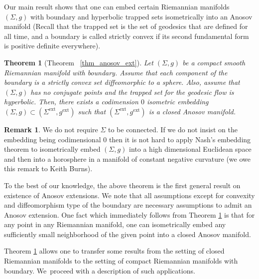 \documentclass[10pt]{amsart}
\newcommand{\ext}{\mathrm{ext}}
\newtheorem{thmintro}{Theorem}
\theoremstyle{definition}
\newtheorem*{remark*}{Remark}
\renewcommand{\>}{{\rangle}}
\newcommand{\<}{{\langle}}
\begin{document}
Our main result shows that one can embed certain Riemannian manifolds $(\Sigma, g)$ with boundary and hyperbolic trapped sets isometrically into an Anosov manifold (Recall that the trapped set is the set of geodesics that are defined for all time, and a boundary is called strictly convex if its second fundamental form is positive definite everywhere).


\begin{thmintro}[Theorem ~\ref{thm_anosov_ext}]\label{thm_anosov_intro}
Let $(\Sigma, g)$ be a compact smooth Riemannian manifold with boundary. Assume that each component of the boundary is a strictly convex set diffeomorphic to a sphere. Also, assume that $(\Sigma, g)$ has no conjugate points and the trapped set for the geodesic flow is hyperbolic. Then, there exists a codimension $0$ isometric embedding $(\Sigma,g)\subset (\Sigma^{\ext}, g^{\ext})$ such that $(\Sigma^{\ext}, g^{\ext})$ is a closed Anosov manifold.
\end{thmintro}

\begin{remark*}We do not require $\Sigma$ to be connected. If we do not insist on the embedding being codimensional $0$ then it is not hard to apply Nash's embedding theorem to isometrically embed $(\Sigma, g)$ into a high dimensional Euclidean space and then into a horosphere in a manifold of constant negative curvature (we owe this remark to Keith Burns).
\end{remark*}
To the best of our knowledge, the above theorem is the first general result on existence of Anosov extensions. We note that all assumptions except for convexity and diffeomorphism type of the boundary are necessary assumptions to admit an Anosov extension. One fact which immediately follows from Theorem \ref{thm_anosov_intro} is that for any point in any Riemannian manifold, one can isometrically embed any sufficiently small neighborhood of the given point into a closed Anosov manifold.

Theorem \ref{thm_anosov_intro} allows one to transfer some results from the setting of closed Riemannian manifolds to the setting of compact Riemannian manifolds with boundary. We~proceed with a description of such applications.
\end{document}
